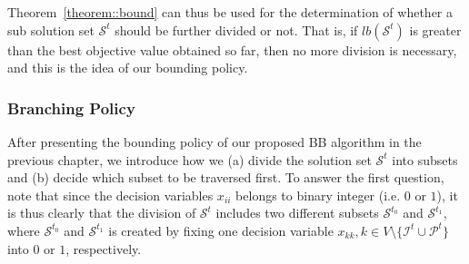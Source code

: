 Theorem~\ref{theorem::bound} can thus be used for the determination of whether a sub solution set $\mathcal{S}^t$ should be further divided or not.
That is, if $lb(\mathcal{S}^t)$ is greater than the best objective value obtained so far, then no more division is necessary, and this is the idea of our bounding policy.

\subsubsection{Branching Policy}
\label{sec::proposedBBBranchingPolicy}
After presenting the bounding policy of our proposed BB algorithm in the previous chapter, we introduce how we (a) divide the solution set $\mathcal{S}^t$ into subsets and (b) decide which subset to be traversed first.
To answer the first question, note that since the decision variables $x_{ii}$ belongs to binary integer (i.e. $0$ or $1$), it is thus clearly that the division of $\mathcal{S}^t$ includes two different subsets $\mathcal{S}^{t_0}$ and $\mathcal{S}^{t_1}$, where  $\mathcal{S}^{t_0}$ and $\mathcal{S}^{t_1}$ is created by fixing one decision variable ${x_{kk},k \in V \setminus \{\mathcal{I}^t \cup \mathcal{P}^t\} }$ into $0$ or $1$, respectively.

